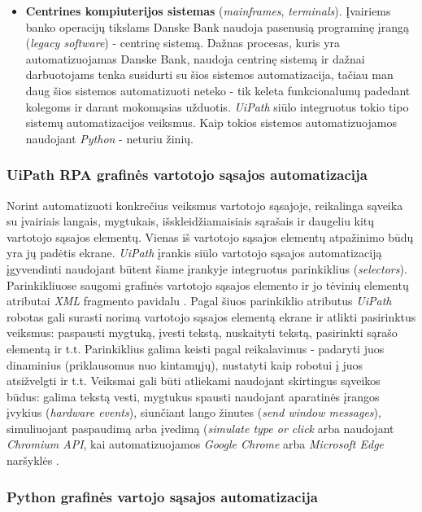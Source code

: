 \documentclass{VUMIFPSBakPrakAt}
\begin{document}
\begin{itemize}
    \item \textbf{Centrines kompiuterijos sistemas} (\textit{mainframes}, \textit{terminals}). Įvairiems banko operacijų tikslams Danske Bank naudoja pasenusią programinę įrangą (\textit{legacy software}) - centrinę sistemą. Dažnas procesas, kuris yra automatizuojamas Danske Bank, naudoja centrinę sistemą ir dažnai darbuotojams tenka susidurti su šios sistemos automatizacija, tačiau man daug šios sistemos automatizuoti neteko - tik keleta funkcionalumų padedant kolegoms ir darant mokomąsias užduotis. \textit{UiPath} siūlo integruotus tokio tipo sistemų automatizacijos veiksmus. Kaip tokios sistemos automatizuojamos naudojant \textit{Python} - neturiu žinių.
\end{itemize}

\subsubsection{UiPath RPA grafinės vartotojo sąsajos automatizacija}

Norint automatizuoti konkrečius veiksmus vartotojo sąsajoje, reikalinga sąveika su įvairiais langais, mygtukais, išskleidžiamaisiais sąrašais ir daugeliu kitų vartotojo sąsajos elementų. Vienas iš vartotojo sąsajos elementų atpažinimo būdų yra jų padėtis ekrane. \textit{UiPath} įrankis siūlo vartotojo sąsajos automatizaciją įgyvendinti naudojant būtent šiame įrankyje integruotus parinkiklius (\textit{selectors}). Parinkikliuose saugomi grafinės vartotojo sąsajos elemento ir jo tėvinių elementų atributai \textit{XML} fragmento pavidalu \cite{selectors}. Pagal šiuos parinkiklio atributus \textit{UiPath} robotas gali surasti norimą vartotojo sąsajos elementą ekrane ir atlikti pasirinktus veiksmus: paspausti mygtuką, įvesti tekstą, nuskaityti tekstą, pasirinkti sąrašo elementą ir t.t. Parinkiklius galima keisti pagal reikalavimus - padaryti juos dinaminius (priklausomus nuo kintamųjų), nustatyti kaip robotui į juos atsižvelgti ir t.t. Veiksmai gali būti atliekami naudojant skirtingus sąveikos būdus: galima tekstą vesti, mygtukus spausti naudojant aparatinės įrangos įvykius (\textit{hardware events}), siunčiant lango žinutes (\textit{send window messages}), simuliuojant paspaudimą arba įvedimą (\textit{simulate type or click} arba naudojant \textit{Chromium API}, kai automatizuojamos \textit{Google Chrome} arba \textit{Microsoft Edge} naršyklės \cite{input-methods}.

\subsubsection{Python grafinės vartojo sąsajos automatizacija}
\end{document}
